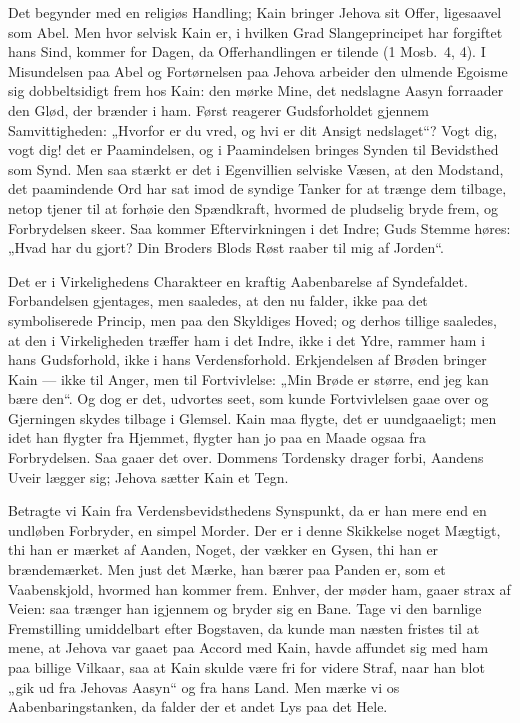 \documentclass[12pt]{book}
\begin{document}
Det begynder med en religiøs Handling; Kain bringer Jehova sit
Offer, ligesaavel som Abel. Men hvor selvisk
Kain er, i hvilken Grad Slangeprincipet har forgiftet hans Sind,
kommer for Dagen, da Offerhandlingen er tilende (1 Mosb.\ 4, 4). I
Misundelsen paa Abel og Fortørnelsen paa Jehova arbeider den ulmende
Egoisme sig dobbeltsidigt frem hos Kain: den mørke Mine, det
nedslagne Aasyn forraader den Glød, der brænder i ham. Først
reagerer Gudsforholdet gjennem Samvittigheden: „Hvorfor er du vred,
og hvi er dit Ansigt nedslaget“? Vogt dig, vogt dig! det er
Paamindelsen, og i Paamindelsen bringes Synden til Bevidsthed som
Synd. Men saa stærkt er det i Egenvillien selviske Væsen, at den
Modstand, det paamindende Ord har sat imod de syndige Tanker for at
trænge dem tilbage, netop tjener til at forhøie den Spændkraft,
hvormed de pludselig bryde frem, og Forbrydelsen skeer. Saa kommer
Eftervirkningen i det Indre; Guds Stemme høres: „Hvad har du gjort?
Din Broders Blods Røst raaber til mig af Jorden“.

Det er i Virkelighedens Charakteer en kraftig Aabenbarelse af
Syndefaldet. Forbandelsen gjentages, men saaledes, at den nu falder,
ikke paa det symboliserede Princip, men paa den Skyldiges Hoved; og
derhos tillige saaledes, at den i Virkeligheden træffer ham i det
Indre, ikke i det Ydre, rammer ham i hans Gudsforhold, ikke i hans
Verdensforhold. Erkjendelsen af Brøden bringer Kain --- ikke til
Anger, men til Fortvivlelse: „Min Brøde er større, end jeg kan bære
den“. Og dog er det, udvortes seet, som kunde Fortvivlelsen gaae
over og Gjerningen skydes tilbage i Glemsel. Kain maa flygte, det er
uundgaaeligt; men idet han flygter fra Hjemmet, flygter han jo paa
en Maade ogsaa fra Forbrydelsen. Saa gaaer det over. Dommens
Tordensky drager forbi, Aandens Uveir lægger sig; Jehova sætter Kain
et Tegn.

Betragte vi Kain fra Verdensbevidsthedens Synspunkt, da er han mere
end en undløben Forbryder, en simpel Morder. Der er i denne
Skikkelse noget Mægtigt, thi
han er mærket af Aanden, Noget, der vækker en Gysen, thi han er
brændemærket. Men just det Mærke, han bærer paa Panden er, som et
Vaabenskjold, hvormed han kommer frem. Enhver, der møder ham, gaaer
strax af Veien: saa trænger han igjennem og bryder sig en Bane. Tage
vi den barnlige Fremstilling umiddelbart efter Bogstaven, da kunde
man næsten fristes til at mene, at Jehova var gaaet paa Accord med
Kain, havde affundet sig med ham paa billige Vilkaar, saa at Kain
skulde være fri for videre Straf, naar han blot „gik ud fra Jehovas
Aasyn“ og fra hans Land. Men mærke vi os Aabenbaringstanken, da
falder der et andet Lys paa det Hele.
\end{document}
